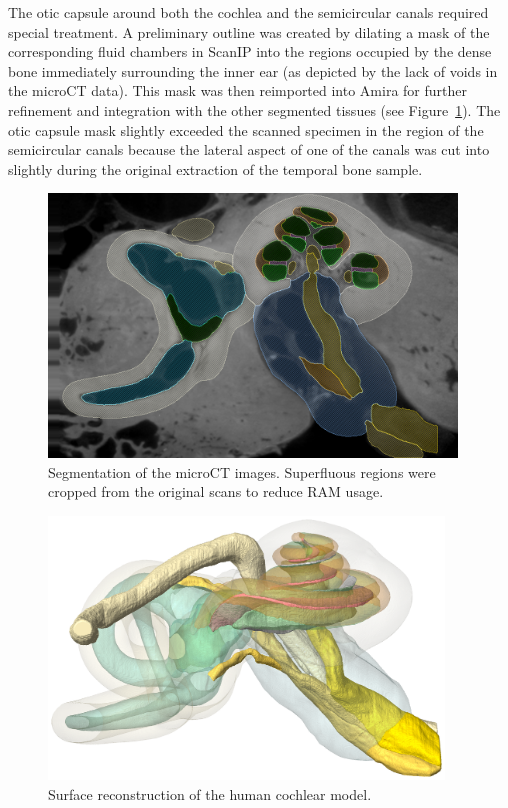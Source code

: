 The otic capsule around both the cochlea and the semicircular canals required
special treatment. A preliminary outline was created by dilating a mask of the
corresponding fluid chambers in ScanIP into the regions occupied by the dense
bone immediately surrounding the inner ear (as depicted by the lack of voids in
the microCT data). This mask was then reimported into Amira for further
refinement and integration with the other segmented tissues (see
Figure~\ref{fig:human_segmentation}). The otic capsule mask slightly exceeded
the scanned specimen in the region of the semicircular canals because the
lateral aspect of one of the canals was cut into slightly during the original
extraction of the temporal bone sample.

\begin{figure}[p]
	\centering
	\includegraphics[height=7cm]{Methodology/human_segmentation}
	\caption[Segmentation of the microCT images]{Segmentation of the microCT
	images. Superfluous regions were cropped from the original scans to reduce
	RAM usage.}
	\label{fig:human_segmentation}
\end{figure}

\begin{figure}[p]
	\centering
	\includegraphics[height=7cm]{Methodology/Gibson_HM_PhD_v1}
	\caption[Surface reconstruction of the human cochlear model]{Surface
	reconstruction of the human cochlear model.}
	\label{fig:human_model_surface}
\end{figure}

